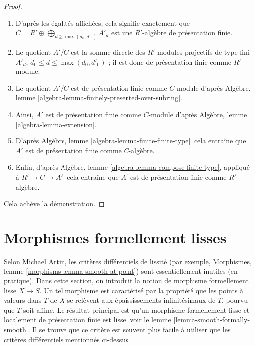 \begin{proof}
\begin{enumerate}
$B \otimes_{R'_0} R'$ est une $R'$-algèbre de présentation finie.
\item[(d)] D'après les égalités affichées, cela signifie exactement que
$C = R' \oplus \bigoplus_{d \geq \max(d_0, d'_0)} A'_d$
est une $R'$-algèbre de présentation finie.
\item[(e)] Le quotient $A'/C$ est la somme directe des
$R'$-modules projectifs de type fini $A'_d$, $d_0 \leq d \leq \max(d_0, d'_0)$ ;
il est donc de présentation finie comme $R'$-module.
\item[(f)] Le quotient $A'/C$ est de présentation finie
comme $C$-module d'après Algèbre, lemme
\ref{algebra-lemma-finitely-presented-over-subring}.
\item[(g)] Ainsi, $A'$ est de présentation finie comme $C$-module d'après
Algèbre, lemme \ref{algebra-lemma-extension}.
\item[(h)] D'après Algèbre, lemme \ref{algebra-lemma-finite-finite-type},
cela entraîne que $A'$ est de présentation finie comme $C$-algèbre.
\item[(i)] Enfin, d'après
Algèbre, lemme \ref{algebra-lemma-compose-finite-type},
appliqué à $R' \to C \to A'$,
cela entraîne que $A'$ est de présentation finie comme $R'$-algèbre.
\end{enumerate}
Cela achève la démonstration.
\end{proof}












\section{Morphismes formellement lisses}
\label{section-formally-smooth}

\noindent
Selon Michael Artin, les critères différentiels de lissité (par exemple,
Morphismes, lemme \ref{morphisms-lemma-smooth-at-point}) sont
essentiellement inutiles (en pratique). Dans cette section, on introduit la
notion de morphisme formellement lisse $X \to S$. Un tel morphisme est
caractérisé par la propriété que les points à valeurs dans $T$ de $X$ se relèvent
aux épaississements infinitésimaux de $T$, pourvu que $T$ soit affine.
Le résultat principal est qu'un morphisme formellement lisse et
localement de présentation finie est lisse, voir
le lemme \ref{lemma-smooth-formally-smooth}.
Il se trouve que ce critère est souvent plus facile à utiliser que les
critères différentiels mentionnés ci-dessus.

